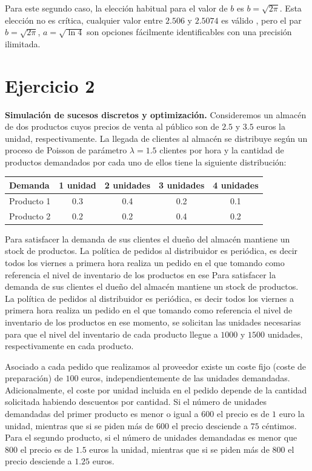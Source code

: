\documentclass[a4paper,12pt]{article}
\begin{document}
	Para este segundo caso, la elección habitual para el valor de $b$ es $b= \sqrt{2\pi}$. Esta elección no es crítica, cualquier valor entre $2.506$ y $2.5074$ es válido \cite{monty-python}, pero el par $b=\sqrt{2\pi}$, $a = \sqrt{\ln 4}$ son opciones fácilmente identificables con una precisión ilimitada.
	
	
\newpage
	\section*{Ejercicio 2}
	\textbf{Simulación de sucesos discretos y optimización.} Consideremos un almacén de dos productos cuyos precios de venta al público
 son de $2.5$ y $3.5$ euros la unidad, respectivamente. La llegada de clientes al
almacén se distribuye según un proceso de Poisson de parámetro $\lambda = 1.5$ clientes
por hora y la cantidad de productos demandados por cada uno de ellos tiene la
siguiente distribución:
	
	\begin{table}[H]
		\centering
		\begin{tabular}{|l||c|c|c|c|}
			\hline
			Demanda    & 1 unidad & 2 unidades & 3 unidades & 4 unidades \\ \hline \hline
			Producto 1 & 0.3      & 0.4        & 0.2        & 0.1        \\ \hline
			Producto 2 & 0.2      & 0.2        & 0.4        & 0.2        \\ \hline
		\end{tabular}
	\end{table}

	Para satisfacer la demanda de sus clientes el dueño del almacén mantiene un
 stock de productos. La política de pedidos al distribuidor es periódica, es decir
 todos los viernes a primera hora realiza un pedido en el que tomando como
referencia el nivel de inventario de los productos en ese Para satisfacer la demanda de sus clientes el dueño del almacén mantiene un
 stock de productos. La política de pedidos al distribuidor es periódica, es decir
todos los viernes a primera hora realiza un pedido en el que tomando como
referencia el nivel de inventario de los productos en ese momento, se solicitan
las unidades necesarias para que el nivel del inventario de cada producto llegue
a $1000$ y $1500$ unidades, respectivamente en cada producto.

	
	Asociado a cada pedido que realizamos al proveedor existe un coste fijo (coste
de preparación) de $100$ euros, independientemente de las unidades
demandadas. Adicionalmente, el coste por unidad incluida en el pedido depende de la cantidad solicitada habiendo descuentos por cantidad. Si el número de
unidades demandadas del primer producto es menor o igual a $600$ el precio es
de $1$ euro la unidad, mientras que si se piden más de $600$ el precio desciende a
$75$ céntimos. Para el segundo producto, si el número de unidades demandadas
es menor que $800$ el precio es de $1.5$ euros la unidad, mientras que si se piden
más de $800$ el precio desciende a $1.25$ euros.
	
\end{document}
